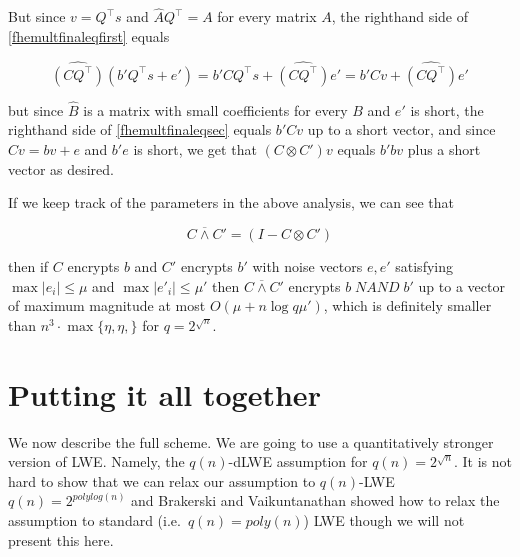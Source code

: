 But since \(v=Q^\top s\) and \(\hat{A}Q^\top = A\) for every matrix
\(A\), the righthand side of \eqref{fhemultfinaleqfirst} equals

\[\widehat{(\ensuremath{\mathit{CQ}}^\top)}(b'Q^\top s+e')=b'C Q^\top s+\widehat{(\ensuremath{\mathit{CQ}}^\top)}e' = b'Cv + \widehat{(\ensuremath{\mathit{CQ}}^\top)}e' \label{fhemultfinaleqsec}\]

but since \(\widehat{B}\) is a matrix with small coefficients for every
\(B\) and \(e'\) is short, the righthand side of
\eqref{fhemultfinaleqsec} equals \(b'Cv\) up to a short vector, and
since \(Cv=bv+e\) and \(b'e\) is short, we get that \((C\otimes C')v\)
equals \(b'bv\) plus a short vector as desired.

If we keep track of the parameters in the above analysis, we can see
that

\begin{equation*}
C \overline{\wedge} C' = (I - C \otimes C')
\end{equation*}

then if \(C\) encrypts \(b\) and \(C'\) encrypts \(b'\) with noise
vectors \(e,e'\) satisfying \(\max |e_i| \leq \mu\) and
\(\max |e'_i| \leq \mu'\) then \(C \overline{\wedge} C'\) encrypts
\(b \; \ensuremath{\mathit{NAND}}\; b'\) up to a vector of maximum
magnitude at most \(O(\mu + n\log q \mu')\), which is definitely smaller
than \(n^3\cdot \max\{\eta,\eta,\}\) for \(q=2^{\sqrt{n}}\).

\section{Putting it all together}\label{15-Putting-it-all-togethe}

We now describe the full scheme. We are going to use a quantitatively
stronger version of LWE. Namely, the \(q(n)\)-dLWE assumption for
\(q(n)=2^{\sqrt{n}}\). It is not hard to show that we can relax our
assumption to \(q(n)\)-LWE \(q(n)=2^{polylog(n)}\) and Brakerski and
Vaikuntanathan showed how to relax the assumption to standard
(i.e.~\(q(n)=poly(n)\)) LWE though we will not present this here.

